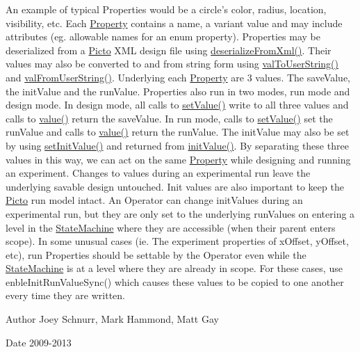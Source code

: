 An example of typical Properties would be a circle's color, radius, location, visibility, etc. Each \hyperlink{class_picto_1_1_property}{Property} contains a name, a variant value and may include attributes (eg. allowable names for an enum property). Properties may be deserialized from a \hyperlink{namespace_picto}{Picto} X\-M\-L design file using \hyperlink{class_picto_1_1_property_a8db200ce04af32ce77a77ea5dd8fba7c}{deserialize\-From\-Xml()}. Their values may also be converted to and from string form using \hyperlink{class_picto_1_1_property_ae4acea7db3b5c1ba4fcca8695a343fc0}{val\-To\-User\-String()} and \hyperlink{class_picto_1_1_property_ac895b7d7c8a015e18deed4a71443b29a}{val\-From\-User\-String()}. Underlying each \hyperlink{class_picto_1_1_property}{Property} are 3 values. The save\-Value, the init\-Value and the run\-Value. Properties also run in two modes, run mode and design mode. In design mode, all calls to \hyperlink{class_picto_1_1_property_a5554f476de8000d1da1b399d9f32d5ca}{set\-Value()} write to all three values and calls to \hyperlink{class_picto_1_1_property_a69540c9d4f9a4b0b128b4c6a876d67ca}{value()} return the save\-Value. In run mode, calls to \hyperlink{class_picto_1_1_property_a5554f476de8000d1da1b399d9f32d5ca}{set\-Value()} set the run\-Value and calls to \hyperlink{class_picto_1_1_property_a69540c9d4f9a4b0b128b4c6a876d67ca}{value()} return the run\-Value. The init\-Value may also be set by using \hyperlink{class_picto_1_1_property_afafa5da20aab9d456225166001427bc4}{set\-Init\-Value()} and returned from \hyperlink{class_picto_1_1_property_a13332ce78a9ce11b496d38c13a857dc7}{init\-Value()}. By separating these three values in this way, we can act on the same \hyperlink{class_picto_1_1_property}{Property} while designing and running an experiment. Changes to values during an experimental run leave the underlying savable design untouched. Init values are also important to keep the \hyperlink{namespace_picto}{Picto} run model intact. An Operator can change init\-Values during an experimental run, but they are only set to the underlying run\-Values on entering a level in the \hyperlink{class_picto_1_1_state_machine}{State\-Machine} where they are accessible (when their parent enters scope). In some unusual cases (ie. The experiment properties of x\-Offset, y\-Offset, etc), run Properties should be settable by the Operator even while the \hyperlink{class_picto_1_1_state_machine}{State\-Machine} is at a level where they are already in scope. For these cases, use enble\-Init\-Run\-Value\-Sync() which causes these values to be copied to one another every time they are written. \begin{DoxyAuthor}{Author}
Joey Schnurr, Mark Hammond, Matt Gay 
\end{DoxyAuthor}
\begin{DoxyDate}{Date}
2009-\/2013 
\end{DoxyDate}


